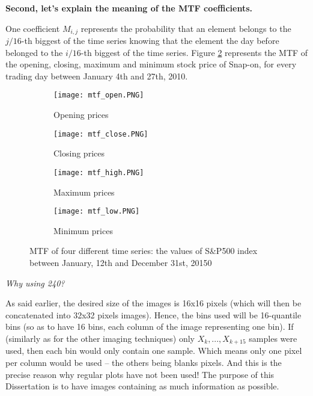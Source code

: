 \documentclass[11pt]{article}
\begin{document}
\begin{onehalfspace}
\noindent \textbf{Second, let's explain the meaning of the MTF coefficients.}

One coefficient $M_{i,j}$ represents the probability that an element belongs to the $j/16$-th biggest of the time series knowing that the element the day before belonged to the $i/16$-th biggest of the time series. Figure \ref{fig:mtf4} represents the MTF of the opening, closing, maximum and minimum stock price of Snap-on, for every trading day between January 4th and 27th, 2010.


\begin{figure}[h!]
    \centering
    \captionsetup{justification=centering}
    \begin{subfigure}{0.24\textwidth}
        \texttt{[image: mtf\_open.PNG]}
        \caption{Opening prices}
        \label{fig:open_concat}
    \end{subfigure}
    \begin{subfigure}{0.24\textwidth}
        \texttt{[image: mtf\_close.PNG]}
        \caption{Closing prices}
    \end{subfigure}
    \begin{subfigure}{0.24\textwidth}
        \texttt{[image: mtf\_high.PNG]}
        \caption{Maximum prices}
    \end{subfigure}    
    \begin{subfigure}{0.24\textwidth}
        \texttt{[image: mtf\_low.PNG]}
        \caption{Minimum prices}
    \end{subfigure}
    \caption{MTF of four different time series: the values of S\&P500 index between January, 12th and December 31st, 20150}
    \label{fig:mtf4}
\end{figure}

\noindent \textit{Why using 240?}

As said earlier, the desired size of the images is 16x16 pixels (which will then be concatenated into 32x32 pixels images). Hence, the bins used will be 16-quantile bins (so as to have 16 bins, each column of the image representing one bin). If (similarly as for the other imaging techniques) only $X_k,..., X_{k+15}$ samples were used, then each bin would only contain one sample. Which means only one pixel per column would be used -- the others being blanks pixels. And this is the precise reason why regular plots have not been used! The purpose of this Dissertation is to have images containing as much information as possible. 


\end{onehalfspace}
\end{document}
